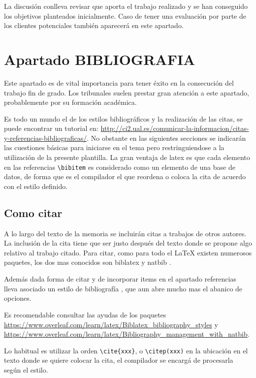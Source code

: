 La discusión conlleva revisar que aporta el trabajo realizado y se  han conseguido los objetivos planteados inicialmente. Caso de tener una evaluación por parte de los clientes potenciales también aparecerá en este apartado.


 \chapter{Apartado BIBLIOGRAFIA}
 Este apartado es de vital importancia para tener éxito en la consecución del trabajo fin de grado. Los tribunales suelen prestar gran atención a este apartado, probablemente por su formación académica. 
 
 Es todo un mundo el de los estilos bibliográficos y la realización de las citas, se puede encontrar un tutorial en:  \url{http://ci2.ual.es/comunicar-la-informacion/citas-y-referencias-bibliograficas/}. No obstante en las siguientes secciones se indicarán las cuestiones básicas para iniciarse en el tema pero restringuiendose a la utilización de la presente plantilla. La gran ventaja de latex es que cada elemento en las referencias   \lstinline[language=enparrafo]!\bibitem! es considerado como un elemento de una base de datos, de forma que es el compilador el que reordena o coloca la cita de acuerdo con el estilo definido.

 \section{Como citar}
A lo largo del texto de la memoria se incluirán citas a trabajos de otros autores. La inclusión de la cita tiene que ser justo después del texto donde se propone algo relativo al trabajo citado. Para citar, como para todo el \LaTeX{} existen numerosos paquetes, los dos mas conocidos son  biblatex y   natbib . 

Además dada forma de citar y de incorporar items en el apartado referencias lleva asociado un estilo de bibliografía    \lstinline[language=enparrafo]!!, que aun abre mucho mas el abanico de opciones. 

Es recomendable consultar las ayudas de los paquetes \url{https://www.overleaf.com/learn/latex/Biblatex_bibliography_styles} y \url{https://www.overleaf.com/learn/latex/Bibliography_management_with_natbib}.

Lo habitual es utilizar la orden      \lstinline[language=enparrafo]!\cite{xxx}!, o   \lstinline[language=enparrafo]!\citep(xxx)!  en la ubicación en el texto donde se quiere colocar la cita, el compilador se encargá de procesarla según el estilo.

